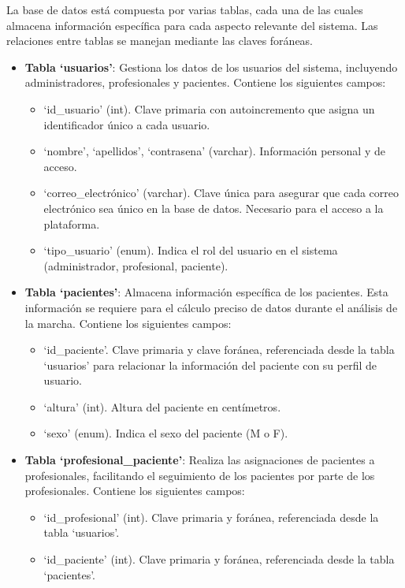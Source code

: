 La base de datos está compuesta por varias tablas, cada una de las cuales almacena información específica para cada aspecto relevante del sistema. Las relaciones entre tablas se manejan mediante las claves foráneas.
\begin{itemize}
    \item \textbf{Tabla `usuarios'}: Gestiona los datos de los usuarios del sistema, incluyendo administradores, profesionales y pacientes. Contiene los siguientes campos:
    \begin{itemize}
        \item `id\_usuario' (int). Clave primaria con autoincremento que asigna un identificador único a cada usuario.
        \item `nombre', `apellidos',  `contrasena' (varchar). Información personal y de acceso.
        \item `correo\_electrónico' (varchar). Clave única para asegurar que cada correo electrónico sea único en la base de datos. Necesario para el acceso a la plataforma.
        \item `tipo\_usuario' (enum). Indica el rol del usuario en el sistema (administrador, profesional, paciente).
    \end{itemize}
    \item \textbf{Tabla `pacientes'}: Almacena información específica de los pacientes. Esta información se requiere para el cálculo preciso de datos durante el análisis de la marcha. Contiene los siguientes campos:
    \begin{itemize}
        \item `id\_paciente'. Clave primaria y clave foránea, referenciada desde la tabla `usuarios' para relacionar la información del paciente con su perfil de usuario.
        \item `altura' (int). Altura del paciente en centímetros.
        \item `sexo' (enum). Indica el sexo del paciente (M o F).
    \end{itemize}
    \item \textbf{Tabla `profesional\_paciente'}: Realiza las asignaciones de pacientes a profesionales, facilitando el seguimiento de los pacientes por parte de los profesionales. Contiene los siguientes campos:
    \begin{itemize}
        \item `id\_profesional' (int). Clave primaria y foránea, referenciada desde la tabla `usuarios'.
        \item `id\_paciente' (int). Clave primaria y foránea, referenciada desde la tabla `pacientes'.

\end{itemize}
\end{itemize}
